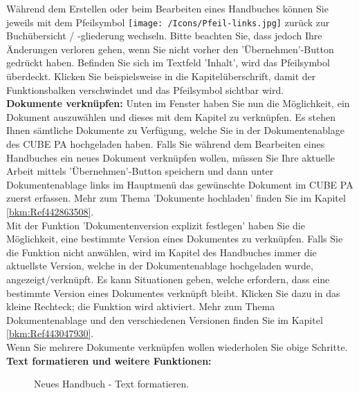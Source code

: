 Während dem Erstellen oder beim Bearbeiten eines Handbuches können Sie jeweils mit dem Pfeilsymbol \texttt{[image: /Icons/Pfeil-links.jpg]}  zurück zur Buchübersicht / -gliederung wechseln. Bitte beachten Sie, dass jedoch Ihre Änderungen verloren gehen, wenn Sie nicht vorher den 'Übernehmen'-Button gedrückt haben. Befinden Sie sich im Textfeld 'Inhalt', wird das Pfeilsymbol überdeckt. Klicken Sie beispielsweise in die Kapitelüberschrift, damit der Funktionsbalken verschwindet und das Pfeilsymbol sichtbar wird. \\

\textbf{Dokumente verknüpfen:} Unten im Fenster haben Sie nun die Möglichkeit, ein Dokument auszuwählen und dieses mit dem Kapitel zu verknüpfen. Es stehen Ihnen sämtliche Dokumente zu Verfügung, welche Sie in der Dokumentenablage des CUBE PA hochgeladen haben. Falls Sie während dem Bearbeiten eines Handbuches ein neues Dokument verknüpfen wollen, müssen Sie Ihre aktuelle Arbeit mittels 'Übernehmen'-Button speichern und dann unter Dokumentenablage links im Hauptmenü das gewünschte Dokument im CUBE PA zuerst erfassen. Mehr zum Thema 'Dokumente hochladen' finden Sie im Kapitel \ref{bkm:Ref442863508}. \\

Mit der Funktion 'Dokumentenversion explizit festlegen'  haben Sie die Möglichkeit, eine bestimmte Version eines Dokumentes zu verknüpfen. Falls Sie die Funktion nicht anwählen, wird im Kapitel des Handbuches immer die aktuellste Version, welche in der Dokumentenablage hochgeladen wurde, angezeigt/verknüpft. Es kann Situationen geben, welche erfordern, dass eine bestimmte Version eines Dokumentes verknüpft bleibt. Klicken Sie dazu in das kleine Rechteck; die Funktion wird aktiviert. Mehr zum Thema Dokumentenablage und den verschiedenen Versionen finden Sie im Kapitel \ref{bkm:Ref443047930}. \\

Wenn Sie mehrere Dokumente verknüpfen wollen wiederholen Sie obige Schritte. \\

\textbf{Text formatieren und weitere Funktionen:}

\begin{figure}[H]
\caption{Neues Handbuch - Text formatieren.}
\end{figure}

